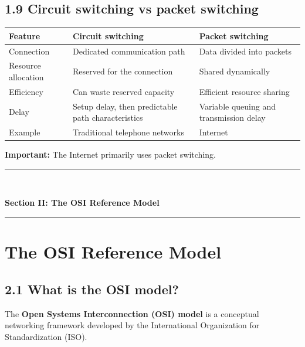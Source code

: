 \subsection{1.9 Circuit switching vs packet switching}

\begin{table}[htbp]
\centering
\begin{tabularx}{\textwidth}{p{4.2cm} X X}
\toprule
\textbf{Feature} & \textbf{Circuit switching} & \textbf{Packet switching} \\
\midrule
Connection & Dedicated communication path & Data divided into packets \\
Resource allocation & Reserved for the connection & Shared dynamically \\
Efficiency & Can waste reserved capacity & Efficient resource sharing \\
Delay & Setup delay, then predictable path characteristics & Variable queuing and transmission delay \\
Example & Traditional telephone networks & Internet \\
\bottomrule
\end{tabularx}
\end{table}

\textbf{Important:} The Internet primarily uses packet switching.


\newpage

\newpage
\begin{center}
\vspace{0.5em}
{\color{primary}\rule{0.45\textwidth}{1.2pt}\\[4pt]}
{\Large\bfseries\color{primary} Section II: The OSI Reference Model\\[2pt]}
{\color{primary}\rule{0.45\textwidth}{1.2pt}}
\vspace{0.5em}
\end{center}

\section{The OSI Reference Model}

\subsection{2.1 What is the OSI model?}

The \textbf{Open Systems Interconnection (OSI) model} is a conceptual networking framework developed by the International Organization for Standardization (ISO).

